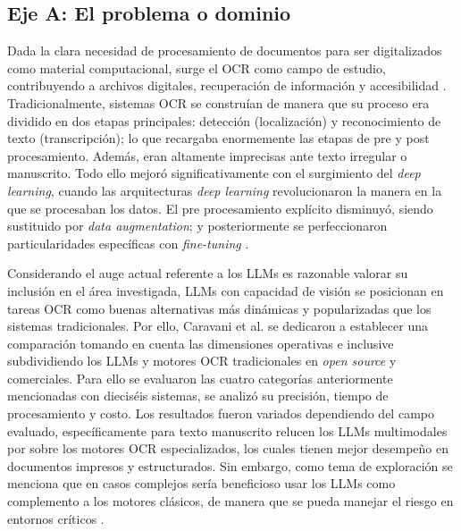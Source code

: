 \documentclass[conference]{IEEEtran}
\begin{document}
\subsection{Eje A: El problema o dominio}
\label{sec:ejeA}

Dada la clara necesidad de procesamiento de documentos para ser digitalizados como material computacional, surge el OCR como campo de estudio, contribuyendo a archivos digitales, recuperación de información \cite{caravani_assessing_2027} y accesibilidad \cite{garrido-munoz_handwritten_2026}. Tradicionalmente, sistemas OCR se construían de manera que su proceso era dividido en dos etapas principales: detección (localización) y reconocimiento de texto (transcripción); lo que recargaba enormemente las etapas de pre y post procesamiento. Además, eran altamente imprecisas ante texto irregular o manuscrito. Todo ello mejoró significativamente con el surgimiento del \textit{deep learning}, cuando las arquitecturas \textit{deep learning} revolucionaron la manera en la que se procesaban los datos. El pre procesamiento explícito disminuyó, siendo sustituido por \textit{data augmentation}; y posteriormente se perfeccionaron particularidades específicas con \textit{fine-tuning} \cite{caravani_assessing_2027}.

Considerando el auge actual referente a los LLMs es razonable valorar su inclusión en el área investigada, LLMs con capacidad de visión se posicionan en tareas OCR como buenas alternativas más dinámicas y popularizadas que los sistemas tradicionales. Por ello, Caravani et al. \cite{caravani_assessing_2027} se dedicaron a establecer una comparación tomando en cuenta las dimensiones operativas e inclusive subdividiendo los LLMs y motores OCR tradicionales en \textit{open source} y comerciales. Para ello se evaluaron las cuatro categorías anteriormente mencionadas con dieciséis sistemas, se analizó su precisión, tiempo de procesamiento y costo. Los resultados fueron variados dependiendo del campo evaluado, específicamente para texto manuscrito relucen los LLMs multimodales por sobre los motores OCR especializados, los cuales tienen mejor desempeño en documentos impresos y estructurados. Sin embargo, como tema de exploración se menciona que en casos complejos sería beneficioso usar los LLMs como complemento a los motores clásicos, de manera que se pueda manejar el riesgo en entornos críticos \cite{caravani_assessing_2027}.
\end{document}
